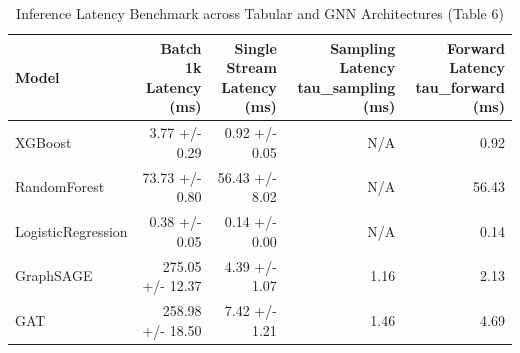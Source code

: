 \begin{table}
\caption{Inference Latency Benchmark across Tabular and GNN Architectures (Table 6)}
\label{tab:latency_benchmark}
\begin{tabular}{lrrrr}
\toprule
Model & Batch 1k Latency (ms) & Single Stream Latency (ms) & Sampling Latency tau_sampling (ms) & Forward Latency tau_forward (ms) \\
\midrule
XGBoost & 3.77 +/- 0.29 & 0.92 +/- 0.05 & N/A & 0.92 \\
RandomForest & 73.73 +/- 0.80 & 56.43 +/- 8.02 & N/A & 56.43 \\
LogisticRegression & 0.38 +/- 0.05 & 0.14 +/- 0.00 & N/A & 0.14 \\
GraphSAGE & 275.05 +/- 12.37 & 4.39 +/- 1.07 & 1.16 & 2.13 \\
GAT & 258.98 +/- 18.50 & 7.42 +/- 1.21 & 1.46 & 4.69 \\
\bottomrule
\end{tabular}
\end{table}
